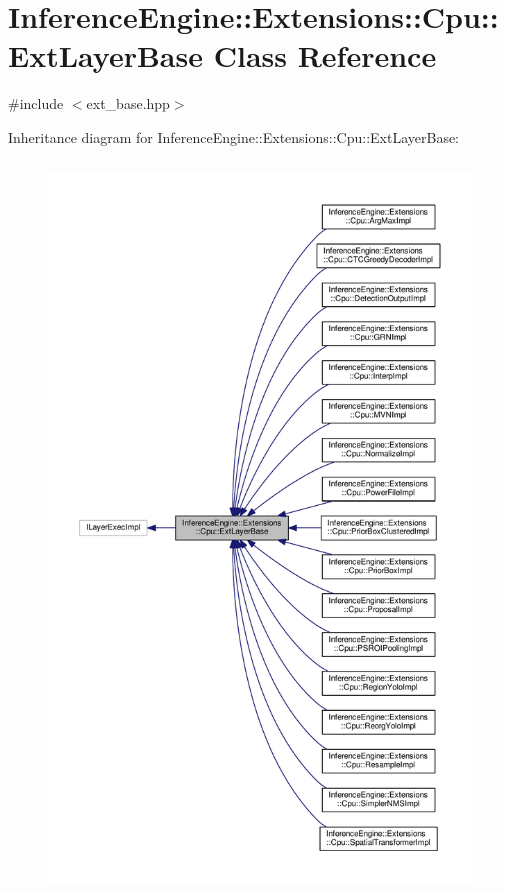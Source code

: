 \hypertarget{classInferenceEngine_1_1Extensions_1_1Cpu_1_1ExtLayerBase}{}\section{Inference\+Engine\+:\+:Extensions\+:\+:Cpu\+:\+:Ext\+Layer\+Base Class Reference}
\label{classInferenceEngine_1_1Extensions_1_1Cpu_1_1ExtLayerBase}


{\ttfamily \#include $<$ext\+\_\+base.\+hpp$>$}



Inheritance diagram for Inference\+Engine\+:\+:Extensions\+:\+:Cpu\+:\+:Ext\+Layer\+Base\+:
\nopagebreak
\begin{figure}[H]
\begin{center}
\leavevmode
\includegraphics[height=550pt]{classInferenceEngine_1_1Extensions_1_1Cpu_1_1ExtLayerBase__inherit__graph}
\end{center}
\end{figure}


